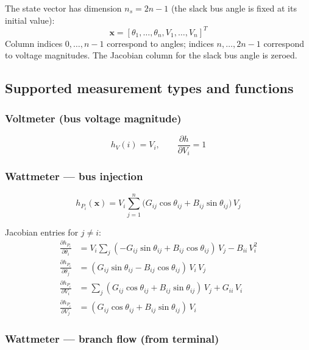 \documentclass[11pt,a4paper]{article}
\begin{document}
The state vector has dimension $n_s = 2n - 1$ (the slack bus angle is
fixed at its initial value):
\begin{equation}
  \mathbf{x} = [\theta_1, \ldots, \theta_n, V_1, \ldots, V_n]^T
\end{equation}
Column indices $0, \ldots, n{-}1$ correspond to angles; indices $n, \ldots,
2n{-}1$ correspond to voltage magnitudes.  The Jacobian column for the
slack bus angle is zeroed.

\subsection{Supported measurement types and functions}

\subsubsection{Voltmeter (bus voltage magnitude)}

\begin{equation}
  h_V(i) = V_i, \qquad
  \frac{\partial h}{\partial V_i} = 1
\end{equation}

\subsubsection{Wattmeter --- bus injection}

\begin{equation}
  h_{P_i}(\mathbf{x}) = V_i \sum_{j=1}^{n}
    \bigl(G_{ij}\cos\theta_{ij} + B_{ij}\sin\theta_{ij}\bigr)\,V_j
\end{equation}

Jacobian entries for $j \neq i$:
\begin{align}
  \frac{\partial h_{P_i}}{\partial \theta_i} &=
    V_i \sum_{j} (-G_{ij}\sin\theta_{ij} + B_{ij}\cos\theta_{ij})\,V_j
    - B_{ii}\,V_i^2 \\
  \frac{\partial h_{P_i}}{\partial \theta_j} &=
    (G_{ij}\sin\theta_{ij} - B_{ij}\cos\theta_{ij})\,V_i\,V_j \\
  \frac{\partial h_{P_i}}{\partial V_i} &=
    \sum_{j} (G_{ij}\cos\theta_{ij} + B_{ij}\sin\theta_{ij})\,V_j
    + G_{ii}\,V_i \\
  \frac{\partial h_{P_i}}{\partial V_j} &=
    (G_{ij}\cos\theta_{ij} + B_{ij}\sin\theta_{ij})\,V_i
\end{align}

\subsubsection{Wattmeter --- branch flow (from terminal)}
\end{document}
